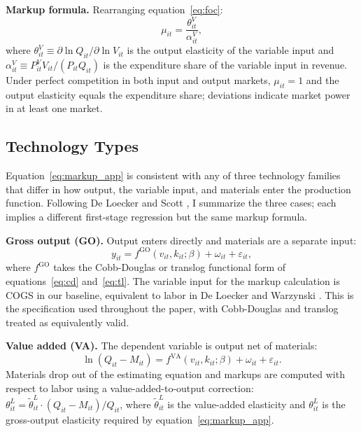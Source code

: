 \documentclass[11pt]{article}
\begin{document}
\textbf{Markup formula.} Rearranging equation~\eqref{eq:foc}:
\begin{equation}\label{eq:markup_app}
    \mu_{it} = \frac{\theta^V_{it}}{\alpha^V_{it}},
\end{equation}
where $\theta^V_{it} \equiv \partial \ln Q_{it} / \partial \ln V_{it}$ is the output elasticity of the variable input and $\alpha^V_{it} \equiv P^V_{it} V_{it} / (P_{it} Q_{it})$ is the expenditure share of the variable input in revenue. Under perfect competition in both input and output markets, $\mu_{it} = 1$ and the output elasticity equals the expenditure share; deviations indicate market power in at least one market.

\subsection{Technology Types}\label{app:technology_types}

Equation~\eqref{eq:markup_app} is consistent with any of three technology families that differ in how output, the variable input, and materials enter the production function. Following De Loecker and Scott \cite{DeLoeckerScott2025}, I summarize the three cases; each implies a different first-stage regression but the same markup formula.

\textbf{Gross output (GO).} Output enters directly and materials are a separate input:
\begin{equation}\label{eq:go_tech}
    y_{it} = f^{\mathrm{GO}}(v_{it}, k_{it}; \beta) + \omega_{it} + \varepsilon_{it},
\end{equation}
where $f^{\mathrm{GO}}$ takes the Cobb-Douglas or translog functional form of equations~\eqref{eq:cd} and~\eqref{eq:tl}. The variable input for the markup calculation is COGS in our baseline, equivalent to labor in De Loecker and Warzynski \cite{DLW2012}. This is the specification used throughout the paper, with Cobb-Douglas and translog treated as equivalently valid.

\textbf{Value added (VA).} The dependent variable is output net of materials:
\begin{equation}\label{eq:va_tech}
    \ln(Q_{it} - M_{it}) = f^{\mathrm{VA}}(v_{it}, k_{it}; \beta) + \omega_{it} + \varepsilon_{it}.
\end{equation}
Materials drop out of the estimating equation and markups are computed with respect to labor using a value-added-to-output correction: $\theta^L_{it} = \tilde\theta^L_{it} \cdot (Q_{it} - M_{it})/Q_{it}$, where $\tilde\theta^L_{it}$ is the value-added elasticity and $\theta^L_{it}$ is the gross-output elasticity required by equation~\eqref{eq:markup_app}.
\end{document}
